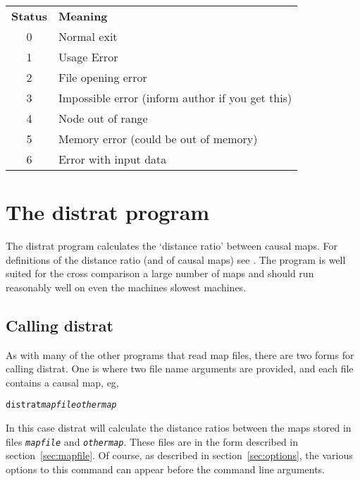 \documentclass[%
	11pt,
        a4paper,
        twoside]{workrep}
\newcommand*{\prg}[1]{\textsf{#1}}		%
\begin{document}
\begin{center}
\begin{tabular}{cp{8cm}}
\bfseries Status & \bfseries Meaning\\[5pt]
0 & Normal exit\\
1 & Usage Error\\
2 & File opening error\\
3 & Impossible error (inform author if you get this)\\
4 & Node out of range\\
5 & Memory error (could be out of memory)\\
6 & Error with input data
\end{tabular}
\end{center}



\chapter{The \prg{distrat} program}\label{ch:distrat}

The \prg{distrat} program
calculates the `distance ratio' between causal maps.  For
definitions of the distance ratio (and of causal maps) see
.
The program is well
suited for the cross comparison a large number of maps and should run
reasonably well on even the machines slowest machines.

\section{Calling \prg{distrat}}

As with many of the other programs that read map files, there are two
forms for calling \prg{distrat}.  One is where two
file name arguments are provided, and each file contains a causal map, eg,
\begin{alltt}
distrat \textit{mapfile} \textit{othermap}
\end{alltt}
In this case \prg{distrat} will calculate the distance ratios between
the maps stored in files \texttt{\itshape mapfile} and
\texttt{\itshape othermap}.  These files are in the form described in
section~\ref{sec:mapfile}.  Of course, as described in
section~\ref{sec:options}, the various options to this command can appear
before the command line arguments.
\end{document}
